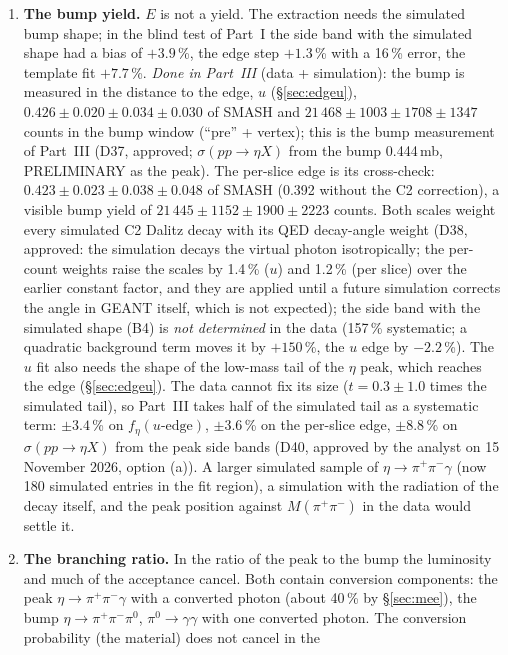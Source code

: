 \documentclass[11pt,a4paper]{article}
\newcommand{\piz}{\ensuremath{\pi^{0}}\xspace}
\newcommand{\pipi}{\ensuremath{\pi^{+}\pi^{-}}\xspace}
\newcommand{\Mpipi}{\ensuremath{M(\pi^{+}\pi^{-})}\xspace}
\begin{document}
\begin{enumerate}
\item \textbf{The bump yield.} $E$ is not a yield. The extraction needs the simulated bump shape; in the blind test of Part~I the side band with
      the simulated shape had a bias of $+3.9$\,\%, the edge step $+1.3$\,\% with a 16\,\% error, the template fit $+7.7$\,\%.
      \emph{Done in Part~III} (data + simulation): the bump is measured in the distance to the edge, $u$ (\S\ref{sec:edgeu}),
      $0.426\pm0.020\pm0.034\pm0.030$ of SMASH and $21\,468\pm1003\pm1708\pm1347$ counts in the bump window (``pre'' + vertex); this is the
      bump measurement of Part~III (D37, approved; $\sigma(pp\to\eta X)$ from the bump 0.444\,mb, PRELIMINARY as the peak). The per-slice
      edge is its cross-check: $0.423\pm0.023\pm0.038\pm0.048$ of SMASH (0.392 without the C2 correction), a visible bump yield of
      $21\,445\pm1152\pm1900\pm2223$ counts. Both scales weight every simulated C2 Dalitz decay with its QED decay-angle weight (D38, approved:
      the simulation decays the virtual photon isotropically; the per-count weights raise the scales by 1.4\,\% ($u$) and 1.2\,\% (per slice)
      over the earlier constant factor, and they are applied until a future simulation corrects the angle in GEANT itself, which is not
      expected); the
      side band with the simulated shape (B4) is \emph{not determined} in the data (157\,\% systematic; a quadratic background term moves it by
      $+150$\,\%, the $u$ edge by $-2.2$\,\%). The $u$ fit also needs the shape of the low-mass tail of the $\eta$ peak, which reaches the
      edge (\S\ref{sec:edgeu}). The data cannot fix its size ($t=0.3\pm1.0$ times the simulated tail), so Part~III takes half of the
      simulated tail as a systematic term: $\pm3.4$\,\% on $f_\eta(u\text{-edge})$, $\pm3.6$\,\% on the per-slice edge, $\pm8.8$\,\% on
      $\sigma(pp\to\eta X)$ from the peak side bands (D40, approved by the analyst on 15 November 2026, option (a)). A larger simulated sample of $\eta\to\pipi\gamma$ (now 180 simulated entries in
      the fit region), a simulation with the radiation of the decay itself, and the peak position against \Mpipi in the data would settle it.
\item \textbf{The branching ratio.} In the ratio of the peak to the bump the luminosity and much of the acceptance cancel. Both
      contain conversion components: the peak $\eta\to\pipi\gamma$ with a converted photon (about 40\,\% by \S\ref{sec:mee}), the bump
      $\eta\to\pipi\piz$, $\piz\to\gamma\gamma$ with one converted photon. The conversion probability (the material) does not cancel in the

\end{enumerate}
\end{document}
